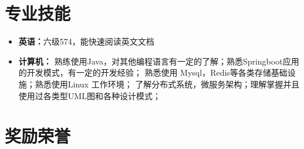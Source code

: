 \documentclass{resume}
\begin{document}
\section{专业技能}
\begin{itemize}
    \item \textbf{英语：}{六级574，能快速阅读英文文档}
    \item \textbf{计算机：}
    {熟练使用Java，对其他编程语言有一定的了解；熟悉Springboot应用的开发模式，有一定的开发经验；
    熟悉使用 Mysql，Redis等各类存储基础设施；熟悉使用Linux 工作环境；
    了解分布式系统，微服务架构；理解掌握并且使用过各类型UML图和各种设计模式；}
\end{itemize}
\sepspace

\section{奖励荣誉}
\end{document}
